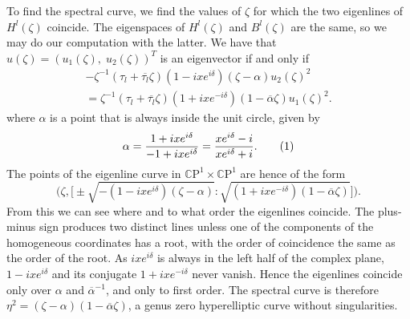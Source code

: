 \documentclass{article}
\numberwithin{equation}{section}
\numberwithin{figure}{section}
\newcommand{\labelthis}[1]{\addtocounter{equation}{1}\tag{\theequation}\label{#1}}
\renewcommand*{\bar}{\overline}
\newcommand{\cji}[1]{\overline{#1}^{-1}}
\newcommand{\iu}{i}
\newcommand{\CP}{\mathbb{C}\text{P}}
\begin{document}
To find the spectral curve, we find the values of $\zeta$ for which the two eigenlines of $H^l(\zeta)$ coincide. The eigenspaces of $H^l(\zeta)$ and $B^l(\zeta)$ are the same, so we may do our computation with the latter. We have that $u(\zeta) = (u_1(\zeta),\; u_2(\zeta))^T$ is an eigenvector if and only if
\begin{multline*}
-\zeta^{-1}(\tau_l + \bar{\tau_l}\zeta)(1 - \iu x e^{\iu \delta})(\zeta-\alpha) u_2(\zeta)^2 \\
= \zeta^{-1}(\tau_l + \bar{\tau_l}\zeta)(1+\iu xe^{-\iu \delta}) (1-\bar{\alpha}\zeta) u_1(\zeta)^2.
\end{multline*}
where $\alpha$ is a point that is always inside the unit circle, given by
\[
\alpha = \frac{1+\iu x e^{\iu \delta}}{-1+\iu x e^{\iu \delta}}
= \frac{x e^{\iu \delta} - \iu}{x e^{\iu \delta} +\iu}.
\labelthis{eqn:def branch point genus zero}
\]
The points of the eigenline curve in $\CP^1 \times\CP^1$ are hence of the form
\[
\Bigg( \zeta, \Bigg[\pm \sqrt{-(1 - \iu x e^{\iu \delta})(\zeta-\alpha)} : \sqrt{(1+\iu xe^{-\iu \delta}) (1-\bar{\alpha}\zeta)} \Bigg] \Bigg).
\]
From this we can see where and to what order the eigenlines coincide. The plus-minus sign produces two distinct lines unless one of the components of the homogeneous coordinates has a root, with the order of coincidence the same as the order of the root. As $\iu x e^{\iu \delta}$ is always in the left half of the complex plane, $1 - \iu x e^{\iu \delta}$ and its conjugate $1 + \iu x e^{-\iu \delta}$ never vanish. Hence the eigenlines coincide only over $\alpha$ and $\cji{\alpha}$, and only to first order. The spectral curve is therefore $\eta^2 = (\zeta-\alpha)(1-\bar{\alpha}\zeta)$, a genus zero hyperelliptic curve without singularities.
\end{document}
